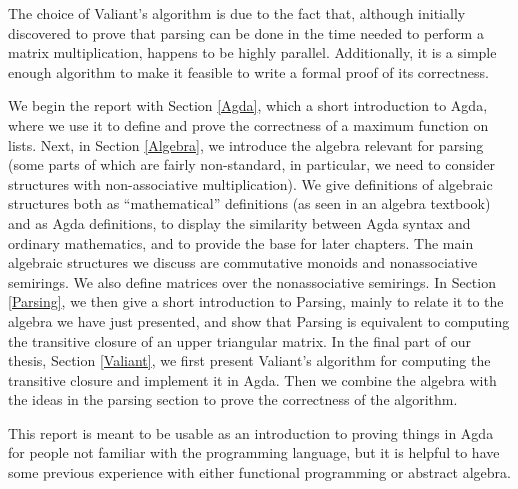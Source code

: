 The choice of Valiant's algorithm is due to the fact that, although initially discovered to prove that parsing can be done in the time needed to perform a matrix multiplication, happens to be highly parallel. Additionally, it is a simple enough algorithm to make it feasible to write a formal proof of its correctness.



We begin the report with Section \ref{Agda}, which a short introduction to Agda, where we use it to define and prove the correctness of a maximum function on lists. Next, in Section \ref{Algebra}, we introduce the algebra relevant for parsing (some parts of which are fairly non-standard, in particular, we need to consider structures with non-associative multiplication). We give definitions of algebraic structures both as ``mathematical'' definitions (as seen in an algebra textbook) and as Agda definitions, to display the similarity between Agda syntax and ordinary mathematics, and to provide the base for later chapters. The main algebraic structures we discuss are commutative monoids and nonassociative semirings. We also define matrices over the nonassociative semirings. In Section \ref{Parsing}, we then give a short introduction to Parsing, mainly to relate it to the algebra we have just presented, and show that Parsing is equivalent to computing the transitive closure of an upper triangular matrix. In the final part of our thesis, Section \ref{Valiant}, we first present Valiant's algorithm for computing the transitive closure and implement it in Agda. Then we combine the algebra with the ideas in the parsing section to prove the correctness of the algorithm.

This report is meant to be usable as an introduction to proving things in Agda for people not familiar with the programming language, but it is helpful to have some previous experience with either functional programming or abstract algebra.
